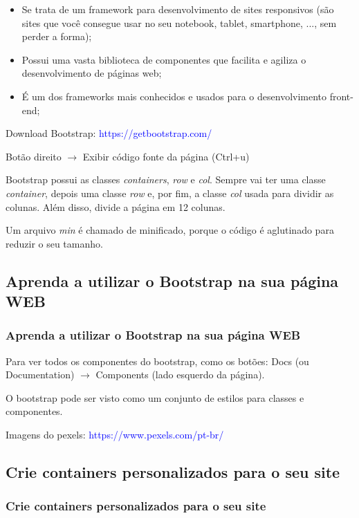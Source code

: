 \documentclass[12pt,a4paper]{article}
\begin{document}
	\begin{itemize}
		\item Se trata de um framework para desenvolvimento de sites responsivos (são sites que você consegue usar no seu notebook, tablet, smartphone, ..., sem perder a forma);
		\item Possui uma vasta biblioteca de componentes que facilita e agiliza o desenvolvimento de páginas web;
		\item É um dos frameworks mais conhecidos e usados para o desenvolvimento front-end;
	\end{itemize}

	Download Bootstrap: \textcolor{blue}{https://getbootstrap.com/}
	
	Botão direito $\rightarrow$ Exibir código fonte da página (Ctrl+u)
	
	Bootstrap possui as classes \textit{containers}, \textit{row} e \textit{col}. Sempre vai ter uma classe \textit{container}, depois uma classe \textit{row} e, por fim, a classe \textit{col} usada para dividir as colunas. Além disso, divide a página em 12 colunas.
	
	Um arquivo \textit{min} é chamado de minificado, porque o código é aglutinado para reduzir o seu tamanho.
	
	\subsection{Aprenda a utilizar o Bootstrap na sua página WEB}
	\subsubsection{Aprenda a utilizar o Bootstrap na sua página WEB}
	
	Para ver todos os componentes do bootstrap, como os botões: Docs (ou Documentation) $\rightarrow$ Components (lado esquerdo da página).
	
	O bootstrap pode ser visto como um conjunto de estilos para classes e componentes.
	
	Imagens do pexels: \textcolor{blue}{https://www.pexels.com/pt-br/}
	
	\subsection{Crie containers personalizados para o seu site}
	\subsubsection{Crie containers personalizados para o seu site}
	
\end{document}
